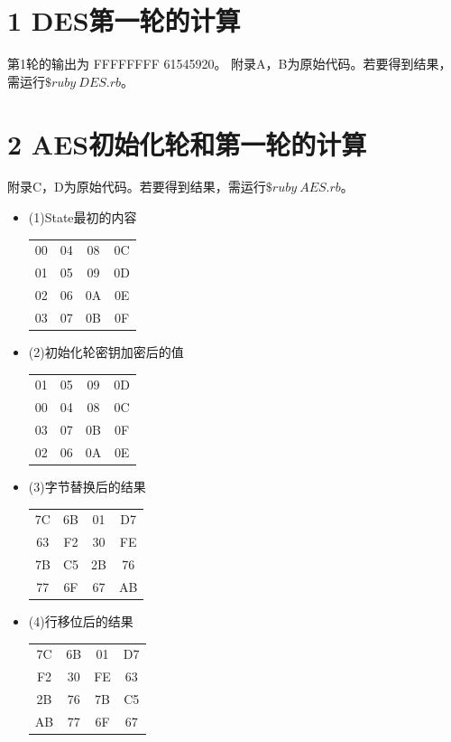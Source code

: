 \documentclass[10pt,a4paper]{article}
\date{\today}
\begin{document}
\makecover
\section*{1 DES第一轮的计算}
第1轮的输出为
FFFFFFFF
61545920。
附录A，B为原始代码。若要得到结果，需运行$\$ruby\ DES.rb$。

\section*{2 AES初始化轮和第一轮的计算}
附录C，D为原始代码。若要得到结果，需运行$\$ruby\ AES.rb$。

\begin{itemize}
    \item[] (1)State最初的内容

    \begin{tabular}{cccc}
    00 & 04 & 08 & 0C \\
    01 & 05 & 09 & 0D \\
    02 & 06 & 0A & 0E \\
    03 & 07 & 0B & 0F \\    
    \end{tabular}
    \item[] (2)初始化轮密钥加密后的值

    \begin{tabular}{cccc}
        01 & 05 & 09 & 0D \\
        00 & 04 & 08 & 0C \\
        03 & 07 & 0B & 0F \\
        02 & 06 & 0A & 0E \\
    \end{tabular}

    \item[] (3)字节替换后的结果

    \begin{tabular}{cccc}
        7C & 6B & 01 & D7 \\
        63 & F2 & 30 & FE \\
        7B & C5 & 2B & 76 \\
        77 & 6F & 67 & AB \\
    \end{tabular}

    \item[] (4)行移位后的结果

    \begin{tabular}{cccc}
        7C & 6B & 01 & D7 \\
        F2 & 30 & FE & 63 \\
        2B & 76 & 7B & C5 \\
        AB & 77 & 6F & 67 \\
    \end{tabular}
    

\end{itemize}
\end{document}
